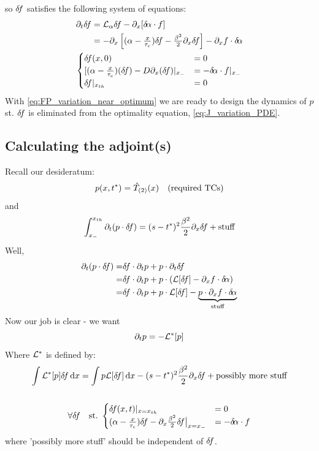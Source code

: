 \documentclass{article}
\begin{document}
so ${ \delta\! f}$ satisfies the following system of equations:
\begin{equation}
\begin{gathered}
\begin{aligned}
\di_t \df 
&= \L_\a \df -\di_x [\da \cdot f]
\\
&= -\di_x \left[ (\a - \tfrac x\tc)\df - \tfrac{\b^2}2 \di_x \df \right]
-\di_xf \cdot\da
\end{aligned}
\\
\begin{cases}
\df(x,0) &= 0
\\
[ (\a - \frac x \tc)(\df) - D \di_x (\df) |_\xmin &= -\da \cdot f|_\xmin
\\
\df|_\xth &= 0
\end{cases}
\end{gathered}
\label{eq:FP_variation_near_optimum}
\end{equation} 
With \cref{eq:FP_variation_near_optimum} we are ready to design the dynamics of
$p$ st. ${ \delta\! f}$ is eliminated from the optimality equation,
\cref{eq:J_variation_PDE}.

\subsection{Calculating the adjoint(s)}
Recall our desideratum:
$$
p(x,{ t^* }) = { \hat{T}_{(2)} }(x) \quad (\text{required TCs})
$$
and
$$
\int_{ x_{-} }^{ x_{th} } {\partial}_t (p \cdot { \delta\! f}) = (s-{ t^* })^2 \frac {{\beta}^2}{2} {\partial}_x 
{ \delta\! f} + \text{stuff}
$$
Well,
\begin{align*}
\di_t (p \cdot \df) =& \df \cdot \di_t p + p \cdot   \di_t \df
 \\
 =& \df \cdot \di_t p + p \cdot \left( \L [\df] -\di_xf \cdot\da \right)  
 \\
 =& \df \cdot \di_t p + p \cdot \L  [\df] - \underbrace{ p \cdot \di_xf \cdot\da}_{\text{stuff}}
\end{align*}
Now our job is clear - we want 
$$
{\partial}_t p = -{ { \mathcal{L} }^* }[p]
$$
Where ${ { \mathcal{L} }^* }$ is defined by:
\begin{equation}
\begin{gathered}
\int  \Lstar [p] \df \intd{x} 
=
\int p \L [\df] \intd{x} - (s-\T)^2 \frac {\b^2}{2}\di_x \df + \text{possibly
more stuff}
\\
\\
\forall \df \quad \st \begin{cases}
\df(x,t) |_{x=\xth} & = 0 
\\
(\a - \tfrac x \tc)\df - \di_x \tfrac {\b^2}2 \df \big|_{x=\xmin} &=  -\da
\cdot f
\end{cases}
\end{gathered}
\end{equation}
where 'possibly more stuff' should be independent of ${ \delta\! f}$.
\end{document}
